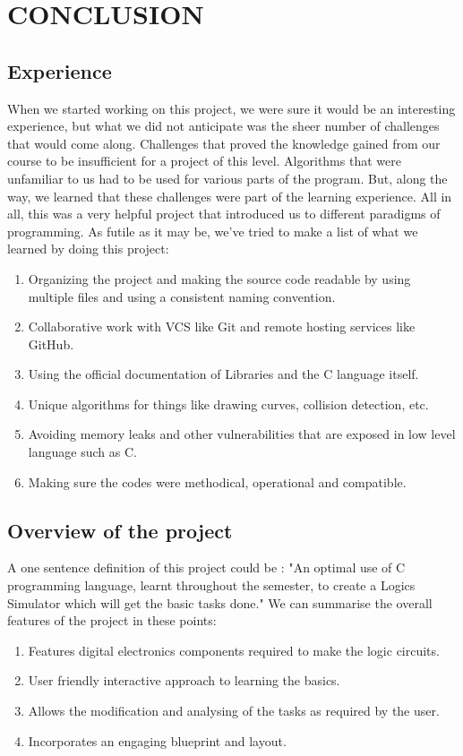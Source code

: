 \documentclass[report]{subfiles}
\begin{document}
    \chapter{CONCLUSION}
    	\section{Experience}
	When we started working on this project, we were sure it would be an interesting experience, but what we did not anticipate was the sheer number of challenges that would come along. Challenges that proved the knowledge gained from our course to be insufficient for a project of this level. Algorithms that were unfamiliar to us had to be used for various parts of the program. But, along the way, we learned that these challenges were part of the learning experience. All in all, this was a very helpful project that introduced us to different paradigms of programming.
As futile as it may be, we've tried to make a list of what we learned by doing this project:
    \begin{enumerate}
        \item{Organizing the project and making the source code readable by using multiple files and using a consistent naming convention.}
        \item{Collaborative work with VCS like Git and remote hosting services like GitHub.}
        \item{Using the official documentation of Libraries and the C language itself.}
        \item{Unique algorithms for things like drawing curves, collision detection, etc.}
        \item{Avoiding memory leaks and other vulnerabilities that are exposed in low level language such as C.}
        \item{Making sure the codes were methodical, operational and compatible.}
    \end{enumerate}
        \section{Overview of the project}
	A one sentence definition of this project could be : "An optimal use of C programming language, learnt throughout the semester, to create a Logics Simulator which will get the basic tasks done." 
	We can summarise the overall features of the project in these points:
    \begin{enumerate}
        \item{Features digital electronics components required to make the logic circuits.}
	\item{User friendly interactive approach to learning the basics.}
	\item{Allows the modification and analysing of the tasks as required by the user.}
	\item{Incorporates an engaging blueprint and layout.}
    \end{enumerate}
\end{document}
